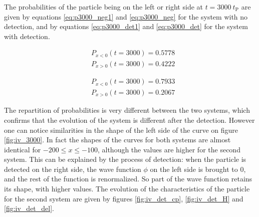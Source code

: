 \documentclass[a4paper,12pt,twoside]{article}
\begin{document}
The probabilities of the particle being on the left or right side at $t=3000~t_\text{P}$ are given by equations \eqref{eq:p3000_neg1} and \eqref{eq:p3000_neg} for the system with no detection, and by equations \eqref{eq:p3000_det1} and \eqref{eq:p3000_det} for the system with detection.

\begin{align}
 &P_{x<0}(t=3000)=0.5778
 \label{eq:p3000_neg1}\\
 &P_{x>0}(t=3000)=0.4222
 \label{eq:p3000_neg}
\end{align}

\begin{align}
 &P_{x<0}(t=3000)=0.7933
 \label{eq:p3000_det1}\\
 &P_{x>0}(t=3000)=0.2067
 \label{eq:p3000_det}
\end{align}

The repartition of probabilities is very different between the two systems, which confirms that the evolution of the system is different after the detection. However one can notice similarities in the shape of the left side of the curve on figure \ref{fig:iv_3000}. In fact the shapes of the curves for both systems are almost identical for $-200\leq x\leq -100$, although the values are higher for the second system. This can be explained by the process of detection: when the particle is detected on the right side, the wave function $\phi$ on the left side is brought to 0, and the rest of the function is renormalized. So part of the wave function retains its shape, with higher values.
The evolution of the characteristics of the particle for the second system are given by figures \ref{fig:iv_det_cp}, \ref{fig:iv_det_H} and \ref{fig:iv_det_del}.
\end{document}
